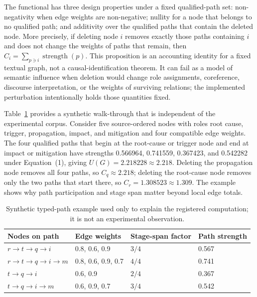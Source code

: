 \documentclass[applsci,article,submit,moreauthors]{Definitions/mdpi}
\begin{document}
The functional has three design properties under a fixed qualified-path set: non-negativity when edge weights are non-negative; nullity for a node that belongs to no qualified path; and additivity over the qualified paths that contain the deleted node. More precisely, if deleting node $i$ removes exactly those paths containing $i$ and does not change the weights of paths that remain, then $C_i=\sum_{p\ni i}\operatorname{strength}(p)$. This proposition is an accounting identity for a fixed textual graph, not a causal-identification theorem. It can fail as a model of semantic influence when deletion would change role assignments, coreference, discourse interpretation, or the weights of surviving relations; the implemented perturbation intentionally holds those quantities fixed.

Table~\ref{tab:toy-path} provides a synthetic walk-through that is independent of the experimental corpus. Consider five source-ordered nodes with roles root cause, trigger, propagation, impact, and mitigation and four compatible edge weights. The four qualified paths that begin at the root-cause or trigger node and end at impact or mitigation have strengths 0.566964, 0.741559, 0.367423, and 0.542282 under Equation~(1), giving $U(G)=2.218228\approx2.218$. Deleting the propagation node removes all four paths, so $C_{q}\approx2.218$; deleting the root-cause node removes only the two paths that start there, so $C_{r}=1.308523\approx1.309$. The example shows why path participation and stage span matter beyond local edge totals.

\begin{table}[H]
\caption{Synthetic typed-path example used only to explain the registered computation; it is not an experimental observation.}
\label{tab:toy-path}\centering\small
\begin{tabular}{llll}
\toprule
Nodes on path & Edge weights & Stage-span factor & Path strength\\
\midrule
$r\rightarrow t\rightarrow q\rightarrow i$ & 0.8, 0.6, 0.9 & $3/4$ & 0.567\\
$r\rightarrow t\rightarrow q\rightarrow i\rightarrow m$ & 0.8, 0.6, 0.9, 0.7 & $4/4$ & 0.741\\
$t\rightarrow q\rightarrow i$ & 0.6, 0.9 & $2/4$ & 0.367\\
$t\rightarrow q\rightarrow i\rightarrow m$ & 0.6, 0.9, 0.7 & $3/4$ & 0.542\\
\bottomrule
\end{tabular}
\end{table}
\end{document}
